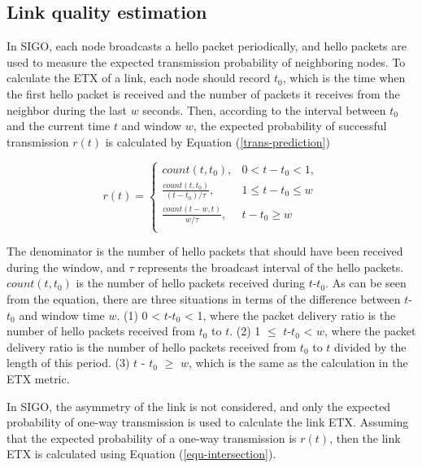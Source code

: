 \documentclass[conference]{IEEEtran}
\begin{document}

\subsection{Link quality estimation}

  In SIGO, each node broadcasts a hello packet periodically, and hello packets are used to measure the expected transmission probability of neighboring nodes. To calculate the ETX of a link, each node should record $t_{0}$, which is the time when the first hello packet is received and the number of packets it receives from the neighbor during the last $w$ seconds. Then, according to the interval between $t_{0}$ and the current time $t$ and window $w$, the expected probability of successful transmission $r(t)$ is calculated by Equation (\ref{trans-prediction})

\begin{equation}
\label{trans-prediction}
r(t) =\begin{cases}count(t, t_{0}), & 0 < t - t_{0} < 1,  \\ \frac{count(t,t_{0})}{(t-t_{0}) / \tau}, & 1 \leq t - t_{0} \leq w\\
\frac{count(t - w,t)}{w / \tau}, &  t - t_{0} \geq w\\
\end{cases}
\end{equation}

The denominator is the number of hello packets that should have been received during the window, and $\tau$ represents the broadcast interval of the hello packets. $count(t,t_{0})$ is the number of hello packets received during $t$-$t_{0}$.  
As can be seen from the equation, there are three situations in terms of the difference between $t$-$t_{0}$ and window time $w$. (1) 0 < $t$-$t_{0}$ < 1, where the packet delivery ratio is the number of hello packets received from $t_{0}$ to $t$. (2) 1 $\leq$ $t$-$t_{0}$ < $w$, where the packet delivery ratio is the number of hello packets received from $t_{0}$ to $t$ divided by the length of this period. (3) $t$ - $t_{0}$ $\geq$ $w$, which is the same as the calculation in the ETX metric.

In SIGO, the asymmetry of the link is not considered, and only the expected probability of one-way transmission is used to calculate the link ETX. 
Assuming that the expected probability of a one-way transmission is $r(t)$, then the link ETX is calculated using Equation (\ref{equ-intersection}).
 
\end{document}
